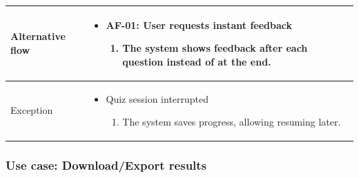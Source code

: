 \begin{table}[H]
    \begin{tabular}{|>{\raggedright\arraybackslash}p{}|>{\raggedright\arraybackslash}p{}|}
        \hline
        Alternative flow &
        \begin{itemize}
            \item AF-01: User requests instant feedback
            \begin{enumerate}
                \item The system shows feedback after each question instead of at the end.
            \end{enumerate}
        \end{itemize} \\
        \hline
        Exception &
        \begin{itemize}
            \item Quiz session interrupted
            \begin{enumerate}
                \item The system saves progress, allowing resuming later.
            \end{enumerate}
        \end{itemize}\\
        \hline
    \end{tabular}
\end{table}

\subsubsection{Use case: Download/Export results}
\newpage 

